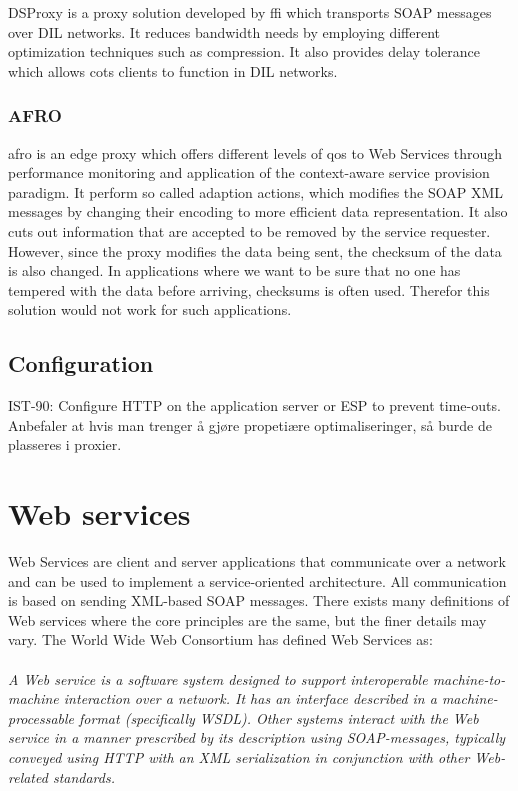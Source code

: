 \documentclass[USenglish]{ifimaster}
\begin{document}
DSProxy is a proxy solution developed by \gls{ffi} which transports SOAP
messages over DIL networks. It reduces bandwidth needs by employing different
optimization techniques such as compression. It also provides delay tolerance
which allows \gls{cots} clients to function in DIL networks.


\subsubsection{AFRO}

\gls{afro} is an edge proxy which offers different levels of \gls{qos} to Web
Services through performance monitoring and application of the context-aware
service provision paradigm. It perform so called adaption actions, which
modifies the SOAP XML messages by changing their encoding to more efficient data
representation. It also cuts out information that are accepted to be removed by
the service requester. However, since the proxy modifies the data being sent,
the checksum of the data is also changed. In applications where we want to be
sure that no one has tempered with the data before arriving, checksums is often
used. Therefor this solution would not work for such applications.


\subsection{Configuration}
IST-90: Configure HTTP on the application server or ESP to prevent time-outs.
Anbefaler at hvis man trenger å gjøre propetiære optimaliseringer, så burde de
plasseres i proxier.


\section{Web services}
\label{web-services}
Web Services are client and server applications that communicate over a network
and can be used to implement a service-oriented architecture. All communication
is based on sending XML-based SOAP messages. There exists many definitions of
Web services where the core principles are the same, but the finer details may
vary. The World Wide Web Consortium has defined Web Services
as\cite{wrc-web-service}:
\paragraph{}
\textit{
    A Web service is a software system designed to support interoperable
    machine-to-machine interaction over a network. It has an interface described in
    a machine-processable format (specifically WSDL). Other systems interact with
    the Web service in a manner prescribed by its description using SOAP-messages,
    typically conveyed using HTTP with an XML serialization in conjunction with
    other Web-related standards.
}
\end{document}
